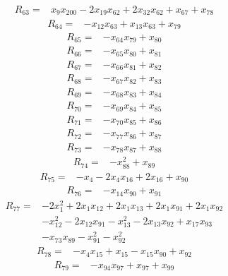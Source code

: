 \begin{align*} R_{63}={}&x_{9}x_{200} -2 x_{19}x_{62} +2 x_{32}x_{62} +x_{67} +x_{78}
\end{align*}
\begin{align*} R_{64}={}&-x_{12}x_{63} +x_{13}x_{63} +x_{79}
\end{align*}
\begin{align*} R_{65}={}&-x_{64}x_{79} +x_{80}
\end{align*}
\begin{align*} R_{66}={}&-x_{65}x_{80} +x_{81}
\end{align*}
\begin{align*} R_{67}={}&-x_{66}x_{81} +x_{82}
\end{align*}
\begin{align*} R_{68}={}&-x_{67}x_{82} +x_{83}
\end{align*}
\begin{align*} R_{69}={}&-x_{68}x_{83} +x_{84}
\end{align*}
\begin{align*} R_{70}={}&-x_{69}x_{84} +x_{85}
\end{align*}
\begin{align*} R_{71}={}&-x_{70}x_{85} +x_{86}
\end{align*}
\begin{align*} R_{72}={}&-x_{77}x_{86} +x_{87}
\end{align*}
\begin{align*} R_{73}={}&-x_{78}x_{87} +x_{88}
\end{align*}
\begin{align*} R_{74}={}&-x_{88}^{2} +x_{89}
\end{align*}
\begin{align*} R_{75}={}&-x_{4} -2 x_{4}x_{16} +2 x_{16} +x_{90}
\end{align*}
\begin{align*} R_{76}={}&-x_{14}x_{90} +x_{91}
\end{align*}
\begin{align*} R_{77}={}&-2 x_{1}^{2} +2 x_{1}x_{12} +2 x_{1}x_{13} +2 x_{1}x_{91} +2 x_{1}x_{92}
\\ &-x_{12}^{2} -2 x_{12}x_{91} -x_{13}^{2} -2 x_{13}x_{92} +x_{17}x_{93}
\\ &-x_{73}x_{89} -x_{91}^{2} -x_{92}^{2}
\end{align*}
\begin{align*} R_{78}={}&-x_{4}x_{15} +x_{15} -x_{15}x_{90} +x_{92}
\end{align*}
\begin{align*} R_{79}={}&-x_{94}x_{97} +x_{97} +x_{99}
\end{align*}
